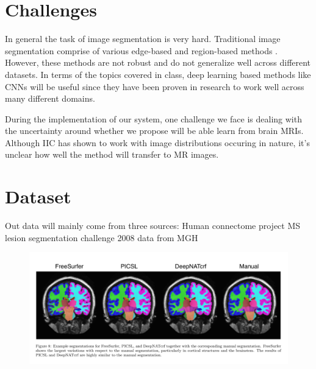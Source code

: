 \documentclass[12pt]{article}
\begin{document}
\section{Challenges}
In general the task of image segmentation is very hard. Traditional image segmentation comprise of various edge-based and region-based methods \cite{segmentation_survey}. However, these methods are not robust and do not generalize well across different datasets. In terms of the topics covered in class, deep learning based methods like CNNs will be useful since they have been proven in research to work well across many different domains.

During the implementation of our system, one challenge we face is dealing with the uncertainty around whether we propose will be able learn from brain MRIs. Although IIC has shown to work with image distributions occuring in nature, it's unclear how well the method will transfer to MR images. 

\section{Dataset}
Out data will mainly come from three sources:
Human connectome project
MS lesion segmentation challenge 2008
data from MGH

\begin{figure}[htbp!]
\includegraphics[width=\textwidth]{ana_seg1.png}
\end{figure}
\end{document}
